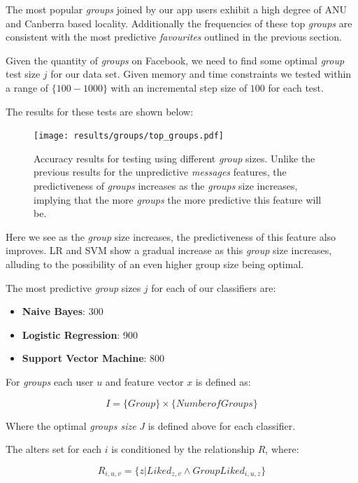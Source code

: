 The most popular \emph{groups} joined by our app users exhibit a high degree of ANU and Canberra based locality. Additionally the 
frequencies of these top \emph{groups} are consistent with the most predictive \emph{favourites} outlined in the previous section.

Given the quantity of \emph{groups} on Facebook, we need to find some optimal \emph{group} test size $j$ for our data set. 
Given memory and time constraints we tested within a range of $\{100-1000\}$ with an incremental step size of $100$ for each test.

\clearpage

The results for these tests are shown below:

\begin{figure}[h]
	\begin{center}
		\texttt{[image: results/groups/top\_groups.pdf]}
		\caption{Accuracy results for testing using different \emph{group} sizes. Unlike the previous results for the unpredictive \emph{messages} features,
				 the predictiveness of \emph{groups} increases as the \emph{groups} size increases, implying that the more \emph{groups} the more 
				 predictive this feature will be.}
	\end{center}
\end{figure}

Here we see as the \emph{group} size increases, the predictiveness of this feature also improves. LR and SVM show a gradual increase 
as this \emph{group} size increases, alluding to the possibility of an even higher group size being optimal.

The most predictive \emph{group} sizes $j$ for each of our classifiers are:
\begin{itemize}
\item \textbf{Naive Bayes}: 300
\item \textbf{Logistic Regression}: 900
\item \textbf{Support Vector Machine}: 800
\end{itemize}

For \emph{groups} each user $u$ and feature vector $x$ is defined as:

\[ I = \{Group\} \times \{Number of Groups\} \]

Where the optimal \emph{groups size} $J$ is defined above for each classifier.

The alters set for each $i$ is conditioned by the relationship $R$, where:

\[ R_{i,u,v} = \{z | Liked_{z,v} \wedge GroupLiked_{i,u,z}\} \]

